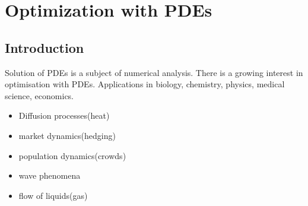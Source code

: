 \chapter{Optimization with PDEs}
\section{Introduction}
Solution of PDEs is a subject of numerical analysis. There is a growing interest in optimisation with PDEs. Applications in biology, chemistry, physics, medical science, economics. 
\begin{itemize}
	\item Diffusion processes(heat)
	\item market dynamics(hedging)
	\item population dynamics(crowds)
	\item wave phenomena
	\item flow of liquids(gas)
\end{itemize}

